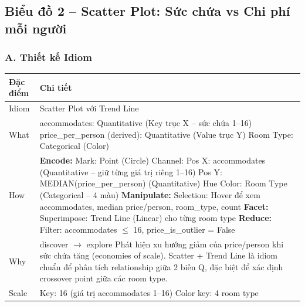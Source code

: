 \subsection{Biểu đồ 2 -- Scatter Plot: Sức chứa vs Chi phí mỗi người}

\subsubsection*{A. Thiết kế Idiom}

\begin{longtable}{|p{2.8cm}|p{11.5cm}|}
\hline
\textbf{Đặc điểm} & \textbf{Chi tiết} \\
\hline
\endhead
\hline
\endfoot
Idiom & Scatter Plot với Trend Line \\
\hline
What & accommodates: Quantitative (Key trục X -- sức chứa 1--16) \newline
price\_per\_person (derived): Quantitative (Value trục Y) \newline
Room Type: Categorical (Color) \\
\hline
How & \textbf{Encode:} \newline
\newline
Mark: Point (Circle) \newline
Channel: \newline
\hspace{0.3cm} Pos X: accommodates (Quantitative -- giữ từng giá trị riêng 1--16) \newline
\hspace{0.3cm} Pos Y: MEDIAN(price\_per\_person) (Quantitative) \newline
\hspace{0.3cm} Hue Color: Room Type (Categorical -- 4 màu) \newline
\newline
\textbf{Manipulate:} \newline
\newline
Selection: Hover để xem accommodates, median price/person, room\_type, count \newline
\newline
\textbf{Facet:} \newline
\newline
Superimpose: Trend Line (Linear) cho từng room type \newline
\newline
\textbf{Reduce:} \newline
\newline
Filter: accommodates $\leq$ 16, price\_is\_outlier = False \\
\hline
Why & discover $\rightarrow$ explore \newline
Phát hiện xu hướng giảm của price/person khi sức chứa tăng (economies of scale). Scatter + Trend Line là idiom chuẩn để phân tích relationship giữa 2 biến Q, đặc biệt để xác định crossover point giữa các room type. \\
\hline
Scale & Key: 16 (giá trị accommodates 1--16) \newline
Color key: 4 room type \\
\hline
\end{longtable}

